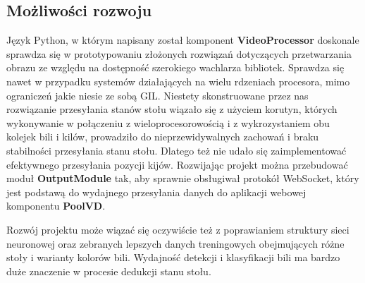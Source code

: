 \documentclass[12pt]{article}
\begin{document}
\subsection{Możliwości rozwoju}

Język Python, w którym napisany został komponent \textbf{VideoProcessor} doskonale sprawdza się w prototypowaniu złożonych rozwiązań dotyczących przetwarzania obrazu ze względu na dostępność szerokiego wachlarza bibliotek. Sprawdza się nawet w przypadku systemów działających na wielu rdzeniach procesora, mimo ograniczeń jakie niesie ze sobą GIL\cite{gil}. Niestety skonstruowane przez nas rozwiązanie przesyłania stanów stołu wiązało się z użyciem korutyn, których wykonywanie w połączeniu z wieloprocesorowością i z wykrozystaniem obu kolejek bili i kilów, prowadziło do nieprzewidywalnych zachowań i braku stabilności przesyłania stanu stołu. Dlatego też nie udało się zaimplementować efektywnego przesyłania pozycji kijów. Rozwijając projekt można przebudować moduł \textbf{OutputModule} tak, aby sprawnie obsługiwał protokół WebSocket, który jest podstawą do wydajnego przesyłania danych do aplikacji webowej komponentu \textbf{PoolVD}.

Rozwój projektu może wiązać się oczywiście też z poprawianiem struktury sieci neuronowej oraz zebranych lepszych danych treningowych obejmujących różne stoły i warianty kolorów bili. Wydajność detekcji i klasyfikacji bili ma bardzo duże znaczenie w procesie dedukcji stanu stołu.

\clearpage
\newpage

\printbibliography
\end{document}
